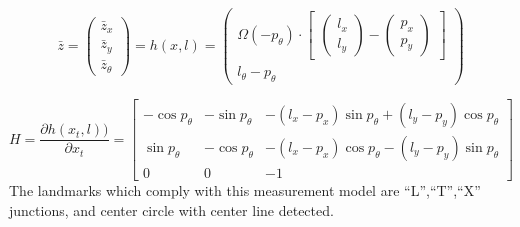 \begin{equation}\label{eq:hx2}
  \bar{z} = \begin{pmatrix}
\bar{z}_{x}\\ 
\bar{z}_{y} \\
\bar{z}_{\theta} 
\end{pmatrix}
= 
h(x, l)
=
\begin{pmatrix}

\Omega(-p_{\theta})
\cdot
\begin{bmatrix}
 \begin{pmatrix}
l_{x}\\ 
l_{y}
\end{pmatrix}
-
\begin{pmatrix}
p_{x}\\ 
p_{y}
\end{pmatrix}
\end{bmatrix} \\
l_{\theta} - p_{\theta}
\end{pmatrix}
\end{equation}

\begin{equation}\label{eq:jH2}
H =
\frac{\partial h(x_t,l))}{\partial x_t}
=
\begin{bmatrix}
  -\cos{p_{\theta}} & -\sin{p_{\theta}} & -(l_x-p_x)\sin{p_{\theta}} + (l_y-p_y)\cos{p_{\theta}} \\ 
  \sin{p_{\theta}} & -\cos{p_{\theta}} & -(l_x-p_x)\cos{p_{\theta}} - (l_y-p_y)\sin{p_{\theta}}  \\
  0 & 0 & -1
\end{bmatrix}
\end{equation}
The landmarks which comply with this measurement model are ``L'',``T'',``X'' junctions, and center circle with center line detected.

